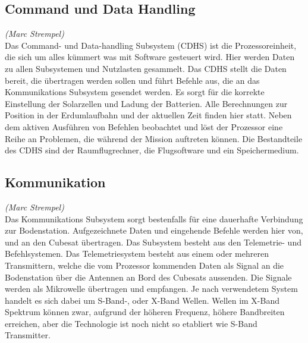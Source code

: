 		\subsection{Command und Data Handling}%
		\hfill\emph{(Marc Strempel)}\\
		Das Command- und Data-handling Subsystem (CDHS) ist die Prozessoreinheit, die sich um alles kümmert was mit Software gesteuert wird. Hier werden Daten zu allen Subsystemen und Nutzlasten gesammelt. Das CDHS stellt die Daten bereit, die übertragen werden sollen und führt Befehle aus, die an das Kommunikations Subsystem gesendet werden. 
Es sorgt für die korrekte Einstellung der Solarzellen und Ladung der Batterien. Alle Berechnungen zur Position in der Erdumlaufbahn und der aktuellen Zeit finden hier statt. Neben dem aktiven Ausführen von Befehlen beobachtet und löst der Prozessor eine Reihe an Problemen, die während der Mission auftreten können. Die Bestandteile des CDHS sind der Raumflugrechner, die Flugsoftware und ein Speichermedium.\cite{Lettau.}

		\subsection{Kommunikation}%
		\hfill\emph{(Marc Strempel)}\\
Das Kommunikations Subsystem sorgt bestenfalls für eine dauerhafte Verbindung zur Bodenstation. Aufgezeichnete Daten und eingehende Befehle werden hier von, und an den Cubesat übertragen. Das Subsystem besteht aus den Telemetrie- und Befehlsystemen.
Das Telemetriesystem besteht aus einem oder mehreren Transmittern, welche die vom Prozessor kommenden Daten als Signal an die Bodenstation über die Antennen an Bord des Cubesats aussenden. Die Signale werden als Mikrowelle übertragen und empfangen. Je nach verwendetem System handelt es sich dabei um S-Band-, oder X-Band Wellen. Wellen im X-Band Spektrum können zwar, aufgrund der höheren Frequenz, höhere Bandbreiten erreichen, aber die Technologie ist noch nicht so etabliert wie S-Band Transmitter.\cite{Lettau.}
		
